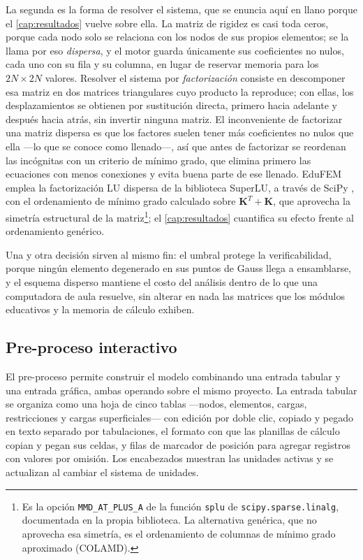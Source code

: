 La segunda es la forma de resolver el sistema, que se enuncia aquí en llano porque el \autoref{cap:resultados} vuelve sobre ella. La matriz de rigidez es casi toda ceros, porque cada nodo solo se relaciona con los nodos de sus propios elementos; se la llama por eso \emph{dispersa}, y el motor guarda únicamente sus coeficientes no nulos, cada uno con su fila y su columna, en lugar de reservar memoria para los $2N \times 2N$ valores. Resolver el sistema por \emph{factorización} consiste en descomponer esa matriz en dos matrices triangulares cuyo producto la reproduce; con ellas, los desplazamientos se obtienen por sustitución directa, primero hacia adelante y después hacia atrás, sin invertir ninguna matriz. El inconveniente de factorizar una matriz dispersa es que los factores suelen tener más coeficientes no nulos que ella —lo que se conoce como llenado—, así que antes de factorizar se reordenan las incógnitas con un criterio de mínimo grado, que elimina primero las ecuaciones con menos conexiones y evita buena parte de ese llenado. EduFEM emplea la factorización LU dispersa de la biblioteca SuperLU, a través de SciPy \autocite[p.~264]{virtanen2020scipy}, con el ordenamiento de mínimo grado calculado sobre $\bm{K}^{T}+\bm{K}$, que aprovecha la simetría estructural de la matriz\footnote{Es la opción \texttt{MMD\_AT\_PLUS\_A} de la función \texttt{splu} de \texttt{scipy.sparse.linalg}, documentada en la propia biblioteca. La alternativa genérica, que no aprovecha esa simetría, es el ordenamiento de columnas de mínimo grado aproximado (COLAMD).}; el \autoref{cap:resultados} cuantifica su efecto frente al ordenamiento genérico.

Una y otra decisión sirven al mismo fin: el umbral protege la verificabilidad, porque ningún elemento degenerado en sus puntos de Gauss llega a ensamblarse, y el esquema disperso mantiene el costo del análisis dentro de lo que una computadora de aula resuelve, sin alterar en nada las matrices que los módulos educativos y la memoria de cálculo exhiben.

\subsection{Pre-proceso interactivo}
\label{sec:pre-proceso}

El pre-proceso permite construir el modelo combinando una entrada tabular y una entrada gráfica, ambas operando sobre el mismo proyecto. La entrada tabular se organiza como una hoja de cinco tablas —nodos, elementos, cargas, restricciones y cargas superficiales— con edición por doble clic, copiado y pegado en texto separado por tabulaciones, el formato con que las planillas de cálculo copian y pegan sus celdas, y filas de marcador de posición para agregar registros con valores por omisión. Los encabezados muestran las unidades activas y se actualizan al cambiar el sistema de unidades.

